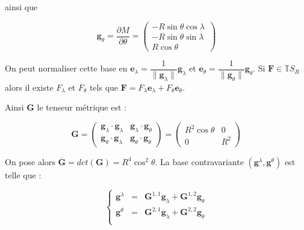 ainsi que 

\begin{equation}
\mathbf{g}_{\theta} = \dfrac{\partial M}{\partial \theta} = \begin{pmatrix}
- R \sin \theta \cos \lambda \\ 
- R \sin \theta \sin \lambda \ \\ 
R \cos \theta
\end{pmatrix} 
\end{equation}

\begin{remarque}
\label{base_lonlat}
On peut normaliser cette base en $\mathbf{e}_{\lambda} = \dfrac{1}{\| \mathbf{g}_{\lambda} \|} \mathbf{g}_{\lambda}$ et $\mathbf{e}_{\theta} = \dfrac{1}{\| \mathbf{g}_{\theta} \|} \mathbf{g}_{\theta}$. Si $\mathbf{F} \in \mathbb{T}S_R$ alors il existe $F_{\lambda}$ et $F_{\theta}$ tels que $\mathbf{F} = F_{\lambda} \mathbf{e}_{\lambda} + F_{\theta} \mathbf{e}_{\theta}$.
\end{remarque}

Ainsi $\mathbf{G}$ le tenseur métrique est :

\begin{equation}
\mathbf{G} = 
\begin{pmatrix}
\mathbf{g}_{\lambda} \cdot \mathbf{g}_{\lambda} & \mathbf{g}_{\lambda} \cdot \mathbf{g}_{\theta} \\
\mathbf{g}_{\theta} \cdot \mathbf{g}_{\lambda} & \mathbf{g}_{\theta} \cdot \mathbf{g}_{\theta}
\end{pmatrix}
 =
\begin{pmatrix}
R^2 \cos \theta & 0 \\
0 & R^2
\end{pmatrix}
\end{equation}

On pose alors $\overline{\mathbf{G}} = det (\mathbf{G}) = R^4 \cos^2 \theta$. La base contravariante $( \mathbf{g}^{\lambda}, \mathbf{g}^{\theta} ) $ est telle que :

\begin{equation}
\left\lbrace 
\begin{array}{rcl}
\mathbf{g}^{\lambda} & = & \mathbf{G}^{1,1} \mathbf{g}_{\lambda} + \mathbf{G}^{1,2} \mathbf{g}_{\theta} \\
\mathbf{g}^{\theta} & = & \mathbf{G}^{2,1} \mathbf{g}_{\lambda} + \mathbf{G}^{2,2} \mathbf{g}_{\theta} \\
\end{array}
\right.
\end{equation}

